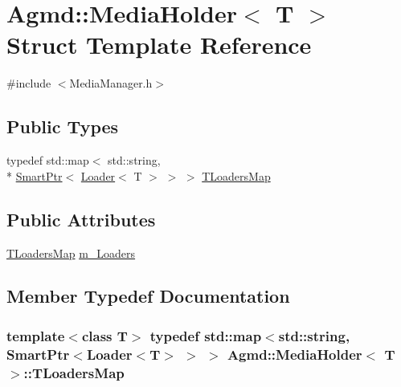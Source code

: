\hypertarget{struct_agmd_1_1_media_holder}{\section{Agmd\+:\+:Media\+Holder$<$ T $>$ Struct Template Reference}
\label{struct_agmd_1_1_media_holder}
}


{\ttfamily \#include $<$Media\+Manager.\+h$>$}

\subsection*{Public Types}
\begin{DoxyCompactItemize}
\item 
typedef std\+::map$<$ std\+::string, \\*
\hyperlink{class_agmd_utilities_1_1_smart_ptr}{Smart\+Ptr}$<$ \hyperlink{class_agmd_1_1_loader}{Loader}$<$ T $>$ $>$ $>$ \hyperlink{struct_agmd_1_1_media_holder_a83cffafa9b8630f4719fe710f907a0fb}{T\+Loaders\+Map}
\end{DoxyCompactItemize}
\subsection*{Public Attributes}
\begin{DoxyCompactItemize}
\item 
\hyperlink{struct_agmd_1_1_media_holder_a83cffafa9b8630f4719fe710f907a0fb}{T\+Loaders\+Map} \hyperlink{struct_agmd_1_1_media_holder_a4df2d17cb2fc5e1144b011e3e251836f}{m\+\_\+\+Loaders}
\end{DoxyCompactItemize}


\subsection{Member Typedef Documentation}
\hypertarget{struct_agmd_1_1_media_holder_a83cffafa9b8630f4719fe710f907a0fb}{
\subsubsection[{T\+Loaders\+Map}]{\setlength{\rightskip}{0pt plus 5cm}template$<$class T$>$ typedef std\+::map$<$std\+::string, {\bf Smart\+Ptr}$<${\bf Loader}$<$T$>$ $>$ $>$ {\bf Agmd\+::\+Media\+Holder}$<$ T $>$\+::{\bf T\+Loaders\+Map}}}\label{struct_agmd_1_1_media_holder_a83cffafa9b8630f4719fe710f907a0fb}


